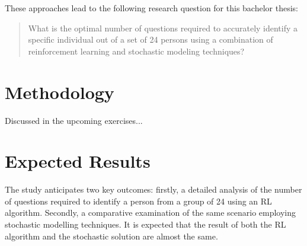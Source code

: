 These approaches lead to the following research question for this bachelor
thesis:

\begin{quote}
	What is the optimal number of questions required to accurately identify a specific individual out of a set of 24 persons using a combination of reinforcement learning and stochastic modeling techniques?
\end{quote}


\section{Methodology}

\iffalse
To answer this question, the bachelor thesis (master thesis) will be realized
as a combination of literature work and practical or prototypical
implementation.

First, the existing literature (extending section \ref{sec:state-of-the-art})
will show how the topic of smooth transition gameplay is dealt with from a
game design perspective. Common factors such as mechanics will be extracted
from this and serve as the basis for a theoretical framework. This framework
will contain a list of core mechanics and guidelines for their application so
that LPD games allow easy entry and a variable number of players.

The applicability of this framework will be tested by an own LPD game developed
during the term project. By asking simple qualitative questions to the players
and observing the visitors during several test runs, it will be determined
whether smooth transition gameplay could be achieved with the mechanics used.
\fi
Discussed in the upcoming exercises...

\section{Expected Results}

The study anticipates two key outcomes: firstly, a detailed analysis of the number of questions required to identify a person from a group of 24 using an RL algorithm. Secondly, a comparative examination of the same scenario employing stochastic modelling techniques. It is expected that the result of both the RL algorithm and the stochastic solution are almost the same.